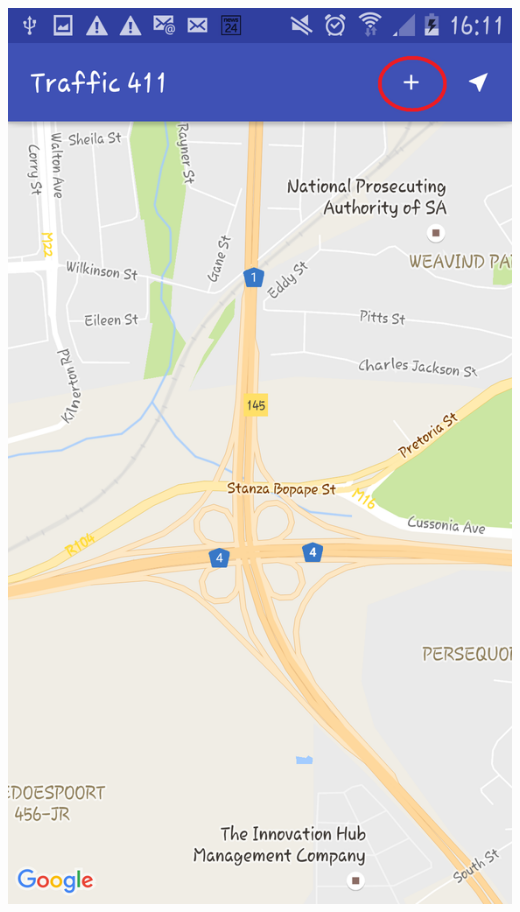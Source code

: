 \documentclass[a4paper,12pt]{article}
\begin{document}
\includegraphics[width=\textwidth]{images/MainScreen2.png}
\end{document}
